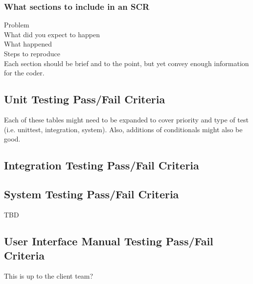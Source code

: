 \documentclass[report]{article}
\begin{document}
\subsubsection{What sections to include in an SCR}

Problem \\
What did you expect to happen \\
What happened \\
Steps to reproduce \\

Each section should be brief and to the point, but yet convey enough information for the coder.

\subsection{Unit Testing Pass/Fail Criteria}
Each of these tables might need to be expanded to cover priority and type of test (i.e. unittest, integration, system). Also, additions of conditionals might also be good.



\newpage

\subsection{Integration Testing Pass/Fail Criteria}


\newpage

\newpage

\newpage

\newpage

\newpage

\newpage

\newpage

\newpage

\newpage


\newpage

\subsection{System Testing Pass/Fail Criteria}
TBD
%

\subsection{User Interface Manual Testing Pass/Fail Criteria}
This is up to the client team?
%
\end{document}
